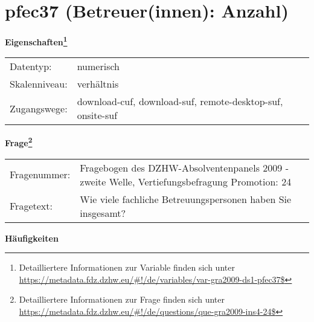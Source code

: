 
    \setcounter{footnote}{0}

    \vspace*{-1.8cm}
	\section{pfec37 (Betreuer(innen): Anzahl)}
	\label{section:pfec37}



    \vspace*{0.5cm}
    \noindent\textbf{Eigenschaften\footnote{Detailliertere Informationen zur Variable finden sich unter
		\url{https://metadata.fdz.dzhw.eu/\#!/de/variables/var-gra2009-ds1-pfec37$}}}\\
	\begin{tabularx}{\hsize}{@{}lX}
	Datentyp: & numerisch \\
	Skalenniveau: & verhältnis \\
	Zugangswege: &
	  download-cuf, 
	  download-suf, 
	  remote-desktop-suf, 
	  onsite-suf
 \\
    \end{tabularx}



				\vspace*{0.5cm}
                \noindent\textbf{Frage\footnote{Detailliertere Informationen zur Frage finden sich unter
		              \url{https://metadata.fdz.dzhw.eu/\#!/de/questions/que-gra2009-ins4-24$}}}\\
				\begin{tabularx}{\hsize}{@{}lX}
					Fragenummer: &
					  Fragebogen des DZHW-Absolventenpanels 2009 - zweite Welle, Vertiefungsbefragung Promotion:
					  24
 \\
					Fragetext: & Wie viele fachliche Betreuungspersonen haben Sie insgesamt? \\
				\end{tabularx}





        		\vspace*{0.5cm}
                \noindent\textbf{Häufigkeiten}

